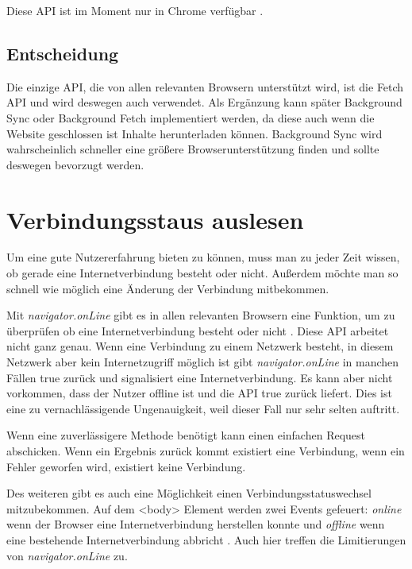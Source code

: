 
Diese \ac{API} ist im Moment nur in Chrome verfügbar \autocite{google-background-fetch}.

\subsection{Entscheidung}
Die einzige \ac{API}, die von allen relevanten Browsern unterstützt wird, ist die Fetch \ac{API} und wird deswegen auch verwendet. Als Ergänzung kann später Background Sync oder Background Fetch implementiert werden, da diese auch wenn die Website geschlossen ist Inhalte herunterladen können. Background Sync wird wahrscheinlich schneller eine größere Browserunterstützung finden und sollte deswegen bevorzugt werden.

\section{Verbindungsstaus auslesen}
Um eine gute Nutzererfahrung bieten zu können, muss man zu jeder Zeit wissen, ob gerade eine Internetverbindung besteht oder nicht. Außerdem möchte man so schnell wie möglich eine Änderung der Verbindung mitbekommen.

Mit \emph{navigator.onLine} gibt es in allen relevanten Browsern \autocite{caniuse-online} eine Funktion, um zu überprüfen ob eine Internetverbindung besteht oder nicht \autocite{Sheppard2017} \autocite{mdn-online}. Diese \ac{API} arbeitet nicht ganz genau. Wenn eine Verbindung zu einem Netzwerk besteht, in diesem Netzwerk aber kein Internetzugriff möglich ist gibt \emph{navigator.onLine} in manchen Fällen true zurück und signalisiert eine Internetverbindung\autocite{Sheppard2017}. Es kann aber nicht vorkommen, dass der Nutzer offline ist und die \ac{API} true zurück liefert. Dies ist eine zu vernachlässigende Ungenauigkeit, weil dieser Fall nur sehr selten auftritt. 

Wenn eine zuverlässigere Methode benötigt kann einen einfachen Request abschicken. Wenn ein Ergebnis zurück kommt existiert eine Verbindung, wenn ein Fehler geworfen wird, existiert keine Verbindung. 

Des weiteren gibt es auch eine Möglichkeit einen Verbindungsstatuswechsel mitzubekommen. Auf dem <body> Element werden zwei Events gefeuert: \emph{online} wenn der Browser eine Internetverbindung herstellen konnte und \emph{offline} wenn eine bestehende Internetverbindung abbricht \autocite{mdn-online}. Auch hier treffen die Limitierungen von \emph{navigator.onLine} zu.
